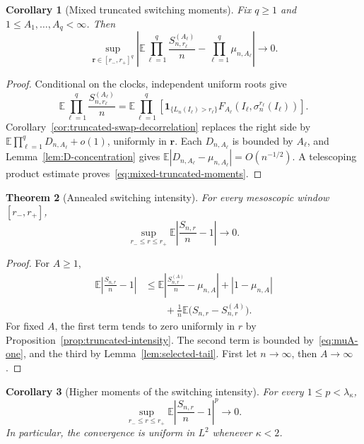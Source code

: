 \documentclass[11pt]{article}
\newcommand{\E}{\mathbb E}
\newcommand{\1}{\mathbf 1}
\newtheorem{theorem}{Theorem}[section]
\newtheorem{corollary}[theorem]{Corollary}
\theoremstyle{definition}
\theoremstyle{remark}
\begin{document}
\begin{corollary}[Mixed truncated switching moments]
\label{cor:mixed-truncated-moments}
Fix $q\geq1$ and $1\leq A_1,\dots,A_q<\infty$.  Then
\begin{equation}\label{eq:mixed-truncated-moments}
 \sup_{\mathbf r\in[r_-,r_+]^q}
 \left|
  \E\prod_{\ell=1}^q\frac{S_{n,r_\ell}^{(A_\ell)}}n
  -\prod_{\ell=1}^q\mu_{n,A_\ell}
 \right|
 \longrightarrow0.
\end{equation}
\end{corollary}

\begin{proof}
Conditional on the clocks, independent uniform roots give
\[
 \E\prod_{\ell=1}^q\frac{S_{n,r_\ell}^{(A_\ell)}}n
 =\E\prod_{\ell=1}^q
 \left[
  \1_{\{L_n(I_\ell)>r_\ell\}}
  F_{A_\ell}(I_\ell,\sigma_n^{r_\ell}(I_\ell))
 \right].
\]
Corollary~\ref{cor:truncated-swap-decorrelation} replaces the right side
by
$\E\prod_{\ell=1}^qD_{n,A_\ell}+o(1)$, uniformly in $\mathbf r$.
Each $D_{n,A_\ell}$ is bounded by $A_\ell$, and
Lemma~\ref{lem:D-concentration} gives
$\E|D_{n,A_\ell}-\mu_{n,A_\ell}|=O(n^{-1/2})$.  A telescoping product
estimate proves~\eqref{eq:mixed-truncated-moments}.
\end{proof}

\begin{theorem}[Annealed switching intensity]
\label{thm:intensity-L1}
For every mesoscopic window $[r_-,r_+]$,
\begin{equation}\label{eq:intensity-L1}
 \sup_{r_-\leq r\leq r_+}
 \E\left|\frac{S_{n,r}}n-1\right|
 \longrightarrow0.
\end{equation}
\end{theorem}

\begin{proof}
For $A\geq1$,
\begin{align*}
 \E\left|\frac{S_{n,r}}n-1\right|
 &\leq
 \E\left|\frac{S_{n,r}^{(A)}}n-\mu_{n,A}\right|
 +|1-\mu_{n,A}|\\
 &\qquad+\frac1n\E\bigl(S_{n,r}-S_{n,r}^{(A)}\bigr).
\end{align*}
For fixed $A$, the first term tends to zero uniformly in $r$ by
Proposition~\ref{prop:truncated-intensity}.  The second term is bounded
by~\eqref{eq:muA-one}, and the third by
Lemma~\ref{lem:selected-tail}.  First let $n\to\infty$, then
$A\to\infty$.
\end{proof}

\begin{corollary}[Higher moments of the switching intensity]
\label{cor:intensity-Lp}
For every $1\leq p<\lambda_\kappa$,
\begin{equation}\label{eq:intensity-Lp}
 \sup_{r_-\leq r\leq r_+}
 \E\left|\frac{S_{n,r}}n-1\right|^p
 \longrightarrow0.
\end{equation}
In particular, the convergence is uniform in $L^2$ whenever
$\kappa<2$.
\end{corollary}
\end{document}

